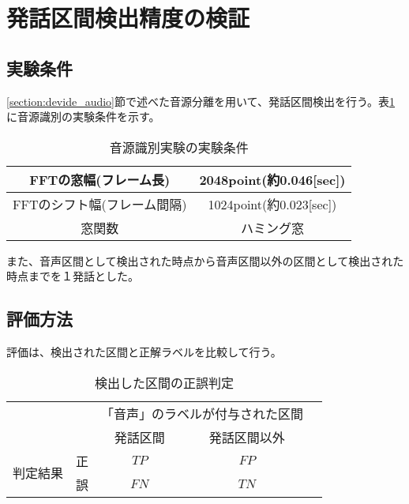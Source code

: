 \section{発話区間検出精度の検証}

\subsection{実験条件}
\ref{section:devide_audio}節で述べた音源分離を用いて、発話区間検出を行う。表\ref{table:detail_identification_method}に音源識別の実験条件を示す。

\begin{table}[H]
  \begin{center}
    \caption{音源識別実験の実験条件 \label{table:detail_identification_method}}
    \begin{tabular}{|c||c|} \hline
      FFTの窓幅(フレーム長) & 2048point(約0.046[sec])   \\ \hline
      FFTのシフト幅(フレーム間隔) &  1024point(約0.023[sec]) \\ \hline
      窓関数 & ハミング窓  \\ \hline
    \end{tabular}
  \end{center}
\end{table}

また、音声区間として検出された時点から音声区間以外の区間として検出された時点までを１発話とした。

\subsection{評価方法}
評価は、検出された区間と正解ラベルを比較して行う。

\begin{table}[H]
\begin{center}
    \caption{検出した区間の正誤判定 \label{table:search_table}}
\begin{tabular}{|c|c|c|c|l}
\cline{1-4}
\multicolumn{2}{|c|}{\multirow{2}{*}{}} & \multicolumn{2}{c|}{「音声」のラベルが付与された区間} &  \\ \cline{3-4}
\multicolumn{2}{|c|}{}                  & 発話区間        & 発話区間以外        &  \\ \cline{1-4}
\multirow{2}{*}{判定結果}        & 正        & $TP$                  & $FP$                   &  \\ \cline{2-4}
& 誤        & $FN$                  & $TN$                   &  \\ \cline{1-4}
\end{tabular}
\end{center}
\end{table}

